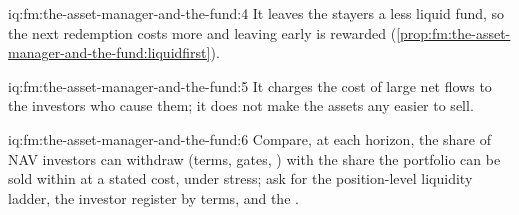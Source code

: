 \begin{solution}{iq:fm:the-asset-manager-and-the-fund:4}
It leaves the stayers a less liquid fund, so the next redemption costs more and leaving early is rewarded
(\cref{prop:fm:the-asset-manager-and-the-fund:liquidfirst}).
\end{solution}

\begin{solution}{iq:fm:the-asset-manager-and-the-fund:5}
It charges the cost of large net flows to the investors who cause them; it does not make the assets any easier to sell.
\end{solution}

\begin{solution}{iq:fm:the-asset-manager-and-the-fund:6}
Compare, at each horizon, the share of NAV investors can withdraw (terms, gates, ) with the share the portfolio can be sold within at
a stated cost, under stress; ask for the position-level liquidity ladder, the investor register by terms, and the .
\end{solution}
